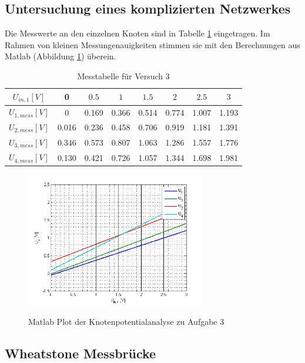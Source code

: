 \documentclass[a4paper]{article}
\begin{document}
\FloatBarrier
\subsection{Untersuchung eines komplizierten Netzwerkes}
Die Messwerte an den einzelnen Knoten sind in Tabelle \ref{tab:messtab3} eingetragen. Im Rahmen von kleinen Messungenauigkeiten stimmen sie mit den Berechnungen aus Matlab (Abbildung \ref{fig:matlabPlot}) überein.

\begin{table}[ht]
    \centering
    \begin{tabular}{| c | c | c | c | c | c | c | c |}
        \hline
         $U_{in,1} [\si{V}]$   & 0     & $0.5$ & $1$   & $1.5$ & $2$   & $2.5$ & $3$   \\\hline
         $U_{1,mess} [\si{V}]$ & 0     & 0.169 & 0.366 & 0.514 & 0.774 & 1.007 & 1.193 \\\hline
         $U_{2,mess} [\si{V}]$ & 0.016 & 0.236 & 0.458 & 0.706 & 0.919 & 1.181 & 1.391 \\\hline
         $U_{3,mess} [\si{V}]$ & 0.346 & 0.573 & 0.807 & 1.063 & 1.286 & 1.557 & 1.776 \\\hline
         $U_{4,mess} [\si{V}]$ & 0.130 & 0.421 & 0.726 & 1.057 & 1.344 & 1.698 & 1.981 \\\hline
    \end{tabular}
    \caption{Messtabelle für Versuch 3}
    \label{tab:messtab3}
\end{table}

\begin{figure}[ht]
    \caption{Matlab Plot der Knotenpotentialanalyse zu Aufgabe 3}
    \centering
    \includegraphics[width=0.7\textwidth]{matlabPlot.png}
    \label{fig:matlabPlot}
\end{figure}

\FloatBarrier
\subsection{Wheatstone Messbrücke}
\end{document}
